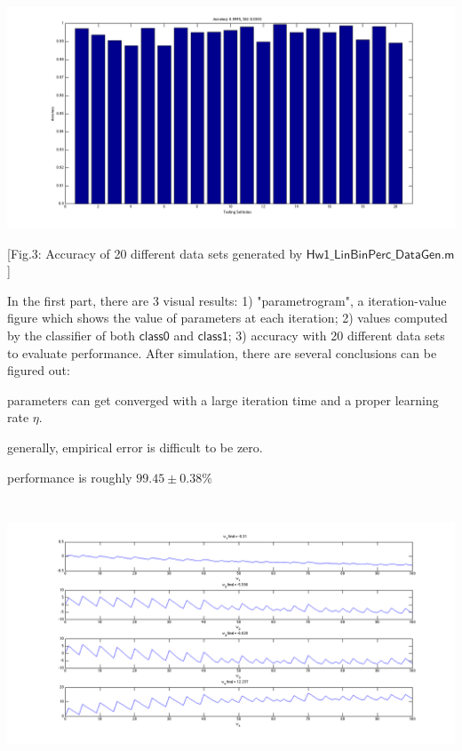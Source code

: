 \documentclass[12pt]{article}
\makeatletter
\renewenvironment{itemize}
{\list{$\bullet$}{\leftmargin\z@ \labelwidth\z@ \itemindent-\leftmargin
\let\makelabel\descriptionlabel}}
{\endlist}
\makeatother
\begin{document}
\vspace*{-2em}
\hspace*{-12.5em}
\includegraphics[scale=.58]{../res/part1_performance.png}
\vspace*{-4em}
\begin{center}
[Fig.3: Accuracy of 20 different data sets generated by $\mathsf{Hw1\_LinBinPerc\_DataGen.m}$]
\end{center}
\newpage
\vspace*{-1.5em}

In the first part, there are 3 visual results: 1) "parametrogram", a iteration-value figure which shows the value of parameters at each iteration; 2) values computed by the classifier of both $\mathsf{class0}$ and $\mathsf{class1}$; 3) accuracy with 20 different data sets to evaluate performance. After simulation, there are several conclusions can be figured out:
\begin{itemize}
	\item parameters can get converged with a large iteration time and a proper learning rate $\eta$.
	\item generally, empirical error is difficult to be zero.
	\item performance is roughly $99.45 \pm 0.38 \%$
\end{itemize}

\vspace*{-0.8em}
\hspace*{-13em}
\includegraphics[width=26.5cm,height=8cm]{../res/part2_parametrogram1_init0.png}
\end{document}
